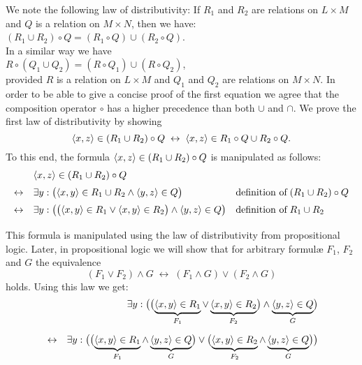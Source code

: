 \noindent
We note the following law of distributivity:  If $R_1$ and $R_2$
are relations on $L \times M$ and  $Q$ is a  relation on $M \times N$, then we have: \\[0.2cm]
\hspace*{1.3cm}  $(R_1 \cup R_2) \circ Q = (R_1 \circ Q) \cup (R_2 \circ Q)$. \\[0.2cm]
In a similar way we have \\[0.2cm]
\hspace*{1.3cm}  $R \circ (Q_1 \cup Q_2) = (R \circ Q_1) \cup (R \circ Q_2)$, \\[0.2cm]
provided $R$ is a  relation on $L \times M$ and $Q_1$ and $Q_2$ are relations on $M \times
N$.  
In order to be able to give a concise proof of the first equation we agree that the
composition operator $\circ$ has a higher precedence than both $\cup$ and $\cap$.  We prove
the first law of distributivity by showing  
\begin{equation}
  \label{eq:dis0}
\pair(x,z) \in (R_1 \cup R_2) \circ Q \;\leftrightarrow\; \pair(x,z) \in R_1 \circ Q \cup R_2 \circ Q.
\end{equation}
To this end, the formula  $\pair(x,z) \in (R_1 \cup R_2) \circ Q$ is manipulated as follows:
\[
\begin{array}{cll}
                  & \pair(x,z) \in (R_1 \cup R_2) \circ Q  \\[0.2cm]
  \leftrightarrow & \exists y: \bigl(\pair(x,y) \in R_1 \cup R_2 \wedge \pair(y,z) \in Q\bigr) 
                  & \mbox{definition of}\; (R_1 \cup R_2) \circ Q \\[0.2cm]
  \leftrightarrow & \exists y: \bigl(\bigl(\pair(x,y) \in R_1 \vee \pair(x,y) \in R_2\bigr) \wedge \pair(y,z) \in Q\bigr) 
                  & \mbox{definition of}\; R_1 \cup R_2 \\[0.2cm]
\end{array}
\]
This formula is manipulated using the law of distributivity from propositional logic.
Later, in propositional logic we will show that for arbitrary {formul\ae}
$F_1$, $F_2$ and $G$ the equivalence 
\[ (F_1 \vee F_2) \wedge G \;\leftrightarrow\; (F_1 \wedge G) \vee (F_2 \wedge G) \]
holds.  Using this law we get:
\begin{eqnarray}
  \nonumber
  & & \exists y: \bigl(\bigl(\underbrace{\pair(x,y) \in R_1}_{F_1} \vee \underbrace{\pair(x,y) \in R_2}_{F_2}\bigr) \wedge \underbrace{\pair(y,z) \in Q}_G\bigr) 
\\[0.2cm] 
  \label{eq:dis1}
  & \leftrightarrow &
    \exists y: \bigl(\bigl(\underbrace{\pair(x,y) \in R_1}_{F_1} \wedge \underbrace{\pair(y,z) \in Q}_G \bigr) \vee 
               \bigl(\underbrace{\pair(x,y) \in R_2}_{F_2} \wedge \underbrace{\pair(y,z) \in Q}_G \bigr) \bigr)   
\end{eqnarray}
